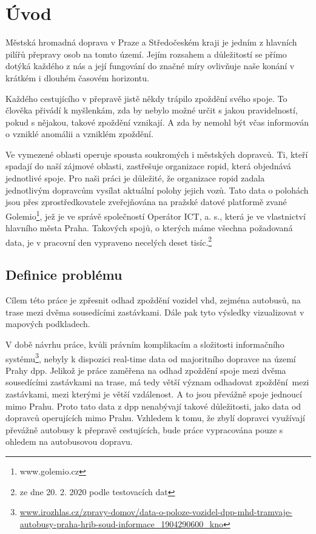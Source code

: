 \chapter*{Úvod}

Městská hromadná doprava v Praze a Středočeském kraji je jedním z hlavních pilířů přepravy osob na tomto území. Jejím rozsahem a důležitostí se přímo dotýká každého z nás a její fungování do značné míry ovlivňuje naše konání v krátkém i dlouhém časovém horizontu.

\bigbreak

Každého cestujícího v přepravě jistě někdy trápilo zpoždění svého spoje. To člověka přivádí k myšlenkám, zda by nebylo možné určit s jakou pravidelností, pokud s nějakou, takové zpoždění vznikají. A zda by nemohl být včas informován o vzniklé anomálii a vzniklém zpoždění.

\bigbreak

Ve vymezené oblasti operuje spousta soukromých i městských dopravců. Ti, kteří spadají do naší zájmové oblasti, zastřešuje organizace \gls{ropid}, která objednává jednotlivé spoje. Pro naši práci je důležité, že organizace \gls{ropid} zadala jednotlivým dopravcům vysílat aktuální polohy jejich vozů. Tato data o polohách jsou přes zprostředkovatele zveřejňována na pražské datové platformě zvané Golemio\footnote{www.golemio.cz}, jež je ve správě společností Operátor ICT, a. s., která je ve vlastnictví hlavního města Praha. Takových spojů, o kterých máme všechna požadovaná data, je v pracovní den vypraveno necelých deset tisíc.\footnote{ze dne 20. 2. 2020 podle testovacích dat}

\section*{Definice problému}

Cílem této práce je zpřesnit odhad zpoždění vozidel \gls{vhd}, zejména autobusů, na trase mezi dvěma sousedícími zastávkami. Dále pak tyto výsledky vizualizovat v mapových podkladech.


\bigbreak

V době návrhu práce, kvůli právním komplikacím a složitosti informačního systému\footnote{\url{www.irozhlas.cz/zpravy-domov/data-o-poloze-vozidel-dpp-mhd-tramvaje-autobusy-praha-hrib-soud-informace_1904290600_kno}}, nebyly k dispozici real-time data od majoritního dopravce na území Prahy \gls{dpp}. Jelikož je práce zaměřena na odhad zpoždění spoje mezi dvěma sousedícími zastávkami na trase, má tedy větší význam odhadovat zpoždění mezi zastávkami, mezi kterými je větší vzdálenost. A to jsou převážně spoje jednoucí mimo Prahu. Proto tato data z \gls{dpp} nenabývají takové důležitosti, jako data od dopravců operujících mimo Prahu. Vzhledem k tomu, že zbylí dopravci využívají převážně autobusy k přepravě cestujících, bude práce vypracována pouze s ohledem na autobusovou dopravu.

